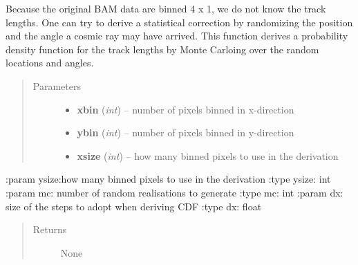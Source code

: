\documentclass[a4paper,11pt,english]{sphinxmanual}
\begin{document}
\begin{fulllineitems}
\label{analysis:analysis.analyseGaiaBAMCosmicRayData.deriveCumulativeFunctionsforBinning}
Because the original BAM data are binned 4 x 1, we do not know the track lengths.
One can try to derive a statistical correction by randomizing the position and the
angle a cosmic ray may have arrived. This function derives a probability density
function for the track lengths by Monte Carloing over the random locations and 
angles.
\begin{quote}\begin{description}
\item[{Parameters}] \leavevmode\begin{itemize}
\item {} 
\textbf{xbin} (\emph{int}) -- number of pixels binned in x-direction

\item {} 
\textbf{ybin} (\emph{int}) -- number of pixels binned in y-direction

\item {} 
\textbf{xsize} (\emph{int}) -- how many binned pixels to use in the derivation

\end{itemize}

\end{description}\end{quote}

:param ysize:how many binned pixels to use in the derivation
:type ysize: int
:param mc: number of random realisations to generate
:type mc: int
:param dx: size of the steps to adopt when deriving CDF
:type dx: float
\begin{quote}\begin{description}
\item[{Returns}] \leavevmode
None

\end{description}\end{quote}

\end{fulllineitems}

\end{document}
